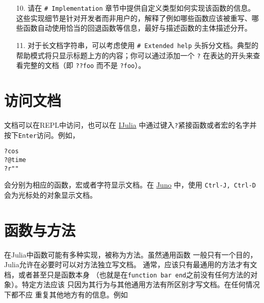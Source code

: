 \begin{itemize}
\item[10. ] 请在 \texttt{\# Implementation} 章节中提供自定义类型如何实现该函数的信息。这些实现细节是针对开发者而非用户的，解释了例如哪些函数应该被重写、哪些函数自动使用恰当的回退函数等信息，最好与描述函数的主体描述分开。


\item[11. ] 对于长文档字符串，可以考虑使用 \texttt{\# Extended help} 头拆分文档。典型的帮助模式将只显示标题上方的内容；你可以通过添加一个 \texttt{?} 在表达的开头来查看完整的文档（即 \texttt{??foo} 而不是 \texttt{?foo}）。

\end{itemize}


\hypertarget{10486321714157126961}{}


\section{访问文档}



文档可以在REPL中访问，也可以在 \href{https://github.com/JuliaLang/IJulia.jl}{IJulia} 中通过键入\texttt{?}紧接函数或者宏的名字并按下\texttt{Enter}访问。例如，




\begin{verbatim}
?cos
?@time
?r""
\end{verbatim}



会分别为相应的函数，宏或者字符显示文档。在 \href{http://junolab.org}{Juno} 中，使用 \texttt{Ctrl-J, Ctrl-D} 会为光标处的对象显示文档。



\hypertarget{5384792468741396562}{}


\section{函数与方法}



在Julia中函数可能有多种实现，被称为方法。虽然通用函数 一般只有一个目的，Julia允许在必要时可以对方法独立写文档。 通常，应该只有最通用的方法才有文档，或者甚至只是函数本身 （也就是在\texttt{function bar end}之前没有任何方法的对象）。特定方法应该 只因为其行为与其他通用方法有所区别才写文档。在任何情况下都不应 重复其他地方有的信息。例如




